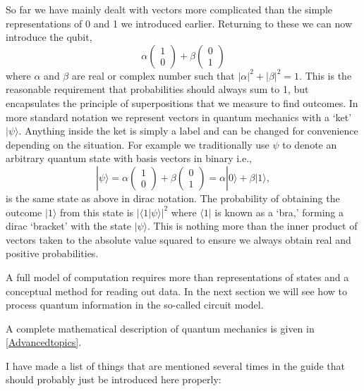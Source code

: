 So far we have mainly dealt with vectors more complicated than the simple representations of 0 and 1 we introduced earlier. Returning to these we can now introduce the qubit,
\begin{equation}
    \alpha \begin{pmatrix}  1\\ 0 \end{pmatrix} + \beta \begin{pmatrix} 0\\ 1 \end{pmatrix}
\end{equation}
where $\alpha$ and $\beta$ are real or complex number such that $|\alpha|^2 + |\beta|^2 = 1$. This is the reasonable requirement that probabilities should always sum to 1, but encapsulates the principle of superpositions that we measure to find outcomes. In more standard notation we represent vectors in quantum mechanics with a `ket' $|\psi\rangle$. Anything inside the ket is simply a label and can be changed for convenience depending on the situation. For example we traditionally use $\psi$ to denote an arbitrary quantum state with basis vectors in binary i.e.,
\begin{equation}
    |\psi\rangle = \alpha \begin{pmatrix}  1\\ 0 \end{pmatrix} + \beta \begin{pmatrix} 0\\ 1 \end{pmatrix} = \alpha |0\rangle + \beta |1\rangle ,
\end{equation}
is the same state as above in dirac notation. The probability of obtaining the outcome $|1\rangle$ from this state is $|\langle 1|\psi\rangle|^2$ where $\langle 1|$ is known as a `bra,' forming a dirac `bracket' with the state $|\psi\rangle.$ This is nothing more than the inner product of vectors taken to the absolute value squared to ensure we always obtain real and positive probabilities. 

A full model of computation requires more than representations of states and a conceptual method for reading out data. In the next section we will see how to process quantum information in the so-called circuit model. 


A complete mathematical description of quantum mechanics is given in \autoref{Advancedtopics}. 


I have made a list of things that are mentioned several times in the guide that should probably just be introduced here properly: 


